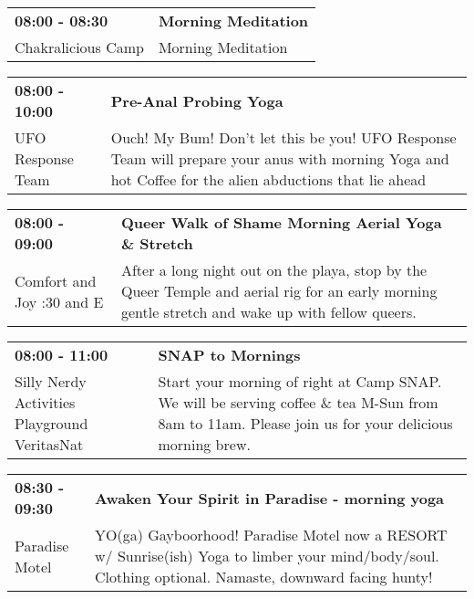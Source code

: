 \begin{tabular}{ p{1in} p{2.2in} }
    \textbf{08:00 - 08:30} & \textbf{Morning Meditation} \\
    Chakralicious Camp \newline  & Morning Meditation \\
    \hline 
\end{tabular}
    
\begin{tabular}{ p{1in} p{2.2in} }
    \textbf{08:00 - 10:00} & \textbf{Pre-Anal Probing Yoga} \\
    UFO Response Team \newline  & Ouch! My Bum! Don't let this be you! UFO Response Team will prepare your anus with morning Yoga and hot Coffee for the alien abductions that lie ahead \\
    \hline 
\end{tabular}
    
\begin{tabular}{ p{1in} p{2.2in} }
    \textbf{08:00 - 09:00} & \textbf{Queer Walk of Shame Morning Aerial Yoga \& Stretch} \\
    Comfort and Joy \newline 7:30 and E & After a long night out on the playa, stop by the Queer Temple and aerial rig for an early morning gentle stretch and wake up with fellow queers. \\
    \hline 
\end{tabular}
    
\begin{tabular}{ p{1in} p{2.2in} }
    \textbf{08:00 - 11:00} & \textbf{SNAP to Mornings} \\
    Silly Nerdy Activities Playground \newline VeritasNat & Start your morning of right at Camp SNAP. We will be serving coffee \& tea M-Sun from 8am to 11am. Please join us for your delicious morning brew. \\
    \hline 
\end{tabular}
    
\begin{tabular}{ p{1in} p{2.2in} }
    \textbf{08:30 - 09:30} & \textbf{Awaken Your Spirit in Paradise - morning yoga} \\
    Paradise Motel \newline  & YO(ga) Gayboorhood! Paradise Motel now a RESORT w/ Sunrise(ish) Yoga to limber your mind/body/soul. Clothing optional. Namaste, downward facing hunty! \\
    \hline 
\end{tabular}
    
